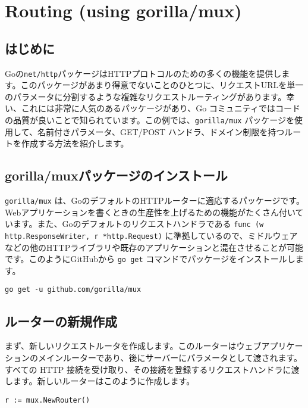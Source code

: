 \section{Routing (using gorilla/mux)}

\subsection{はじめに}

Goの\texttt{net/http}パッケージはHTTPプロトコルのための多くの機能を提供します。このパッケージがあまり得意でないことのひとつに、リクエストURLを単一のパラメータに分割するような複雑なリクエストルーティングがあります。幸い、これには非常に人気のあるパッケージがあり、Go コミュニティではコードの品質が良いことで知られています。この例では、\texttt{gorilla/mux} パッケージを使用して、名前付きパラメータ、GET/POST ハンドラ、ドメイン制限を持つルートを作成する方法を紹介します。

\subsection{gorilla/muxパッケージのインストール}

\texttt{gorilla/mux} は、GoのデフォルトのHTTPルーターに適応するパッケージです。Webアプリケーションを書くときの生産性を上げるための機能がたくさん付いています。また、Goのデフォルトのリクエストハンドラである \texttt{func (w http.ResponseWriter, r *http.Request)} に準拠しているので、ミドルウェアなどの他のHTTPライブラリや既存のアプリケーションと混在させることが可能です。このようにGitHubから \texttt{go get} コマンドでパッケージをインストールします。

\begin{lstlisting}[numbers=none]
go get -u github.com/gorilla/mux
\end{lstlisting}

\subsection{ルーターの新規作成}

まず、新しいリクエストルータを作成します。このルーターはウェブアプリケーションのメインルーターであり、後にサーバーにパラメータとして渡されます。すべての HTTP 接続を受け取り、その接続を登録するリクエストハンドラに渡します。新しいルーターはこのように作成します。

\begin{lstlisting}[numbers=none]
r := mux.NewRouter()
\end{lstlisting}

